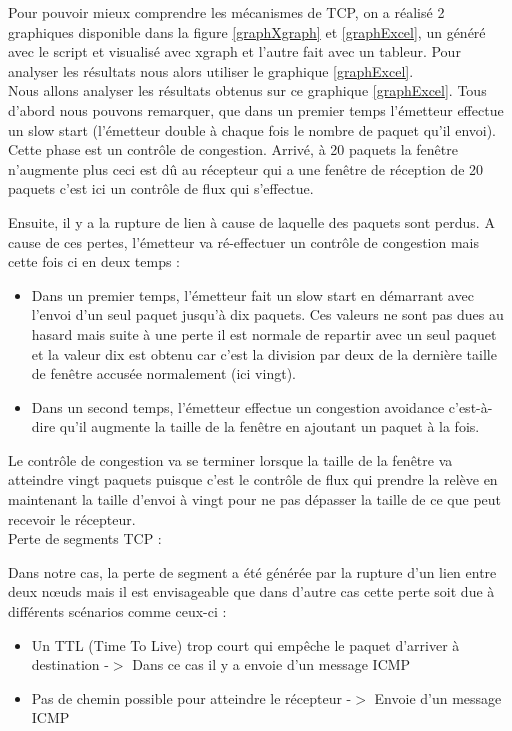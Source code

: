 \documentclass[11pt]{article}
\begin{document}
Pour pouvoir mieux comprendre les mécanismes de TCP, on a réalisé 2 graphiques disponible dans la figure \ref{graphXgraph} et \ref{graphExcel}, un généré avec le script et visualisé avec xgraph et l'autre fait avec un tableur. Pour analyser les résultats nous alors utiliser le graphique \ref{graphExcel}.\\


Nous allons analyser les résultats obtenus sur ce graphique \ref{graphExcel}. Tous d’abord nous pouvons remarquer, que dans un premier temps l’émetteur effectue un slow start (l’émetteur double à chaque fois le nombre de paquet qu’il envoi). Cette phase est un contrôle de congestion. Arrivé, à 20 paquets la fenêtre n’augmente plus ceci est dû au récepteur qui a une fenêtre de réception de 20 paquets c’est ici un contrôle de flux qui s’effectue.

Ensuite, il y a la rupture de lien à cause de laquelle des paquets sont perdus. A cause de ces
pertes, l’émetteur va ré-effectuer un contrôle de congestion mais cette fois ci en deux
temps :
\begin{itemize}
	\item Dans un premier temps, l’émetteur fait un slow start en démarrant avec l’envoi d’un seul paquet jusqu’à dix paquets. Ces valeurs ne sont pas dues au hasard mais suite à une perte il est normale de repartir avec un seul paquet et la valeur dix est obtenu car c’est la division par deux de la dernière taille de fenêtre accusée normalement (ici vingt).

	\item Dans un second temps, l’émetteur effectue un congestion avoidance c’est-à- dire qu’il augmente la taille de la fenêtre en ajoutant un paquet à la fois.
\end{itemize}

Le contrôle de congestion va se terminer lorsque la taille de la fenêtre va atteindre vingt paquets puisque c’est le contrôle de flux qui prendre la relève en maintenant la taille d’envoi à vingt pour ne pas dépasser la taille de ce que peut recevoir le récepteur.\\

\noindent
Perte de segments TCP :

Dans notre cas, la perte de segment a été générée par la rupture d’un lien entre deux nœuds mais il est envisageable que dans d’autre cas cette perte soit due à différents scénarios comme ceux-ci :
\begin{itemize}
	\item Un TTL (Time To Live) trop court qui empêche le paquet d’arriver à destination -$>$ Dans ce cas il y a envoie d'un message ICMP
	\item Pas de chemin possible pour atteindre le récepteur -$>$ Envoie d'un message ICMP
\end{itemize}
 
\end{document}
